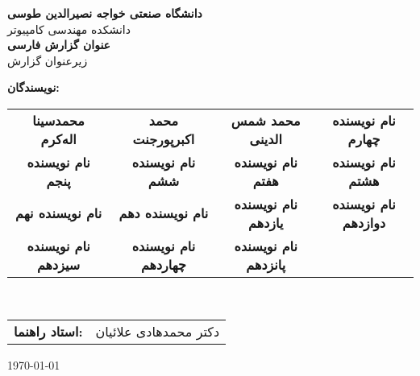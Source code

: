 \begin{titlepage}
    \centering
    
    \vspace*{2cm}
    
    {\Large \textbf{دانشگاه صنعتی خواجه نصیرالدین طوسی}}\\[0.5cm]
    {\large دانشکده مهندسی کامپیوتر}\\[1cm]
    
    {\Huge \textbf{عنوان گزارش فارسی}}\\[0.5cm]
    {\Large زیرعنوان گزارش}\\[1cm]
    
    {\large
        \textbf{نویسندگان:}\\[0.2cm]
        \begin{tabular}{cccc}
            \textbf{محمدسینا اله‌کرم} & \textbf{محمد اکبرپورجنت} &
            \textbf{محمد شمس الدینی} & \textbf{نام نویسنده چهارم} \\ 
            \textbf{نام نویسنده پنجم} & \textbf{نام نویسنده ششم} &
            \textbf{نام نویسنده هفتم} & \textbf{نام نویسنده هشتم} \\
            \textbf{نام نویسنده نهم} & \textbf{نام نویسنده دهم} &
            \textbf{نام نویسنده یازدهم} & \textbf{نام نویسنده دوازدهم} \\
            \textbf{نام نویسنده سیزدهم} & \textbf{نام نویسنده چهاردهم} &
            \textbf{نام نویسنده پانزدهم} \\
            
        \end{tabular}
        \\[1.5cm]
        \begin{tabular}{rl}
            \textbf{استاد راهنما:} & دکتر محمدهادی علائیان \\[0.3cm]
        \end{tabular}
    }
    
    \vfill
    
    {\large \today}
    
\end{titlepage}

\newpage

